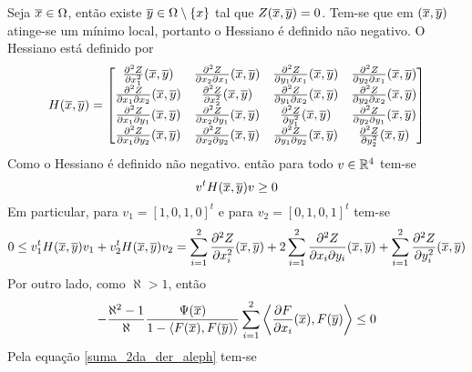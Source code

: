 \begin{demonstracao}
	Seja $\overline{x} \in \Omega$, então existe $\overline{y} \in \Omega \setminus \{x\}$ tal que $Z(\overline{x},\overline{y}) = 0$. Tem-se que em $(\overline{x},\overline{y})$ atinge-se um mínimo local, portanto o Hessiano é definido não negativo. O Hessiano está definido por
	\begin{equation*}
		H(\overline{x},\overline{y}) = \left[ \begin{matrix}
		\frac{\partial^2 Z}{\partial x_1^2}(\overline{x},\overline{y}) & \frac{\partial^2 Z}{\partial x_2 \partial x_1}(\overline{x},\overline{y}) & \frac{\partial^2 Z}{\partial y_1 \partial x_1}(\overline{x},\overline{y}) & \frac{\partial^2 Z}{\partial y_2 \partial x_1}(\overline{x},\overline{y})\\ 
		\frac{\partial^2 Z}{\partial x_1 \partial x_2}(\overline{x},\overline{y}) & \frac{\partial^2 Z}{\partial x_2^2}(\overline{x},\overline{y}) & \frac{\partial^2 Z}{\partial y_1 \partial x_2}(\overline{x},\overline{y}) & \frac{\partial^2 Z}{\partial y_2 \partial x_2}(\overline{x},\overline{y})\\
		 \frac{\partial^2 Z}{\partial x_1 \partial y_1}(\overline{x},\overline{y}) & \frac{\partial^2 Z}{\partial x_2 \partial y_1}(\overline{x},\overline{y}) & \frac{\partial^2 Z}{\partial y_1^2}(\overline{x},\overline{y}) & \frac{\partial^2 Z}{\partial y_2 \partial y_1}(\overline{x},\overline{y})\\
		  \frac{\partial^2 Z}{\partial x_1 \partial y_2}(\overline{x},\overline{y}) & \frac{\partial^2 Z}{\partial x_2 \partial y_2}(\overline{x},\overline{y}) & \frac{\partial^2 Z}{\partial y_1 \partial y_2}(\overline{x},\overline{y}) & \frac{\partial^2 Z}{\partial y_2^2}(\overline{x},\overline{y})
		\end{matrix} \right]
	\end{equation*}	
	Como o Hessiano é definido não negativo. então para todo $v \in \mathbb{R}^4$ tem-se
	\begin{equation*}
		v^t H(\overline{x},\overline{y}) v \geq 0
	\end{equation*}	
	Em particular, para $v_1 = [1,0,1,0]^t$ e para $v_2 = [0,1,0,1]^t$ tem-se
	\begin{equation*}
		0 \leq v_1^t H(\overline{x},\overline{y}) v_1 + v_2^t H(\overline{x},\overline{y}) v_ 2 = \sum_{i=1}^2 \frac{\partial^2 Z}{\partial x_i^2}(\overline{x},\overline{y}) + 2 \sum_{i=1}^2 \frac{\partial^2 Z}{\partial x_i \partial y_i}(\overline{x},\overline{y}) + \sum_{i=1}^2 \frac{\partial^2 Z}{\partial y_i^2}(\overline{x},\overline{y})
	\end{equation*}	
	Por outro lado, como $\aleph > 1$, então
	\begin{equation*}
		- \frac{\aleph^2 - 1}{\aleph} \frac{\Psi(\overline{x})}{1 - \langle F(\overline{x}), F(\overline{y}) \rangle} \sum_{i=1}^2 \left\langle \frac{\partial F}{\partial x_i}(\overline{x}), F(\overline{y}) \right\rangle \leq 0
	\end{equation*}	
	Pela equação \eqref{suma_2da_der_aleph} tem-se

\end{demonstracao}
